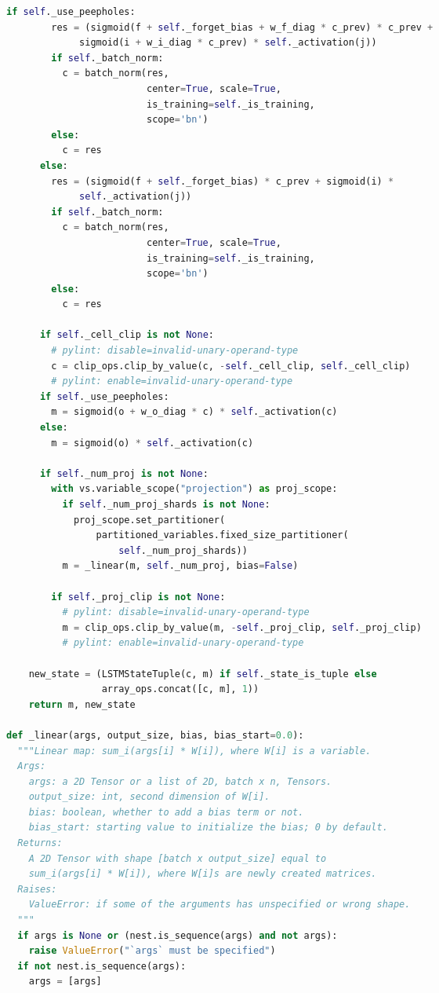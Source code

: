 \begin{landscape}
\begin{multicols}{2}
\begin{lstlisting}[language=Python]
      if self._use_peepholes:
        res = (sigmoid(f + self._forget_bias + w_f_diag * c_prev) * c_prev +
             sigmoid(i + w_i_diag * c_prev) * self._activation(j))
        if self._batch_norm:
          c = batch_norm(res,
                         center=True, scale=True,
                         is_training=self._is_training,
                         scope='bn')
        else:
          c = res
      else:
        res = (sigmoid(f + self._forget_bias) * c_prev + sigmoid(i) *
             self._activation(j))
        if self._batch_norm:
          c = batch_norm(res,
                         center=True, scale=True,
                         is_training=self._is_training,
                         scope='bn')
        else:
          c = res

      if self._cell_clip is not None:
        # pylint: disable=invalid-unary-operand-type
        c = clip_ops.clip_by_value(c, -self._cell_clip, self._cell_clip)
        # pylint: enable=invalid-unary-operand-type
      if self._use_peepholes:
        m = sigmoid(o + w_o_diag * c) * self._activation(c)
      else:
        m = sigmoid(o) * self._activation(c)

      if self._num_proj is not None:
        with vs.variable_scope("projection") as proj_scope:
          if self._num_proj_shards is not None:
            proj_scope.set_partitioner(
                partitioned_variables.fixed_size_partitioner(
                    self._num_proj_shards))
          m = _linear(m, self._num_proj, bias=False)

        if self._proj_clip is not None:
          # pylint: disable=invalid-unary-operand-type
          m = clip_ops.clip_by_value(m, -self._proj_clip, self._proj_clip)
          # pylint: enable=invalid-unary-operand-type

    new_state = (LSTMStateTuple(c, m) if self._state_is_tuple else
                 array_ops.concat([c, m], 1))
    return m, new_state

def _linear(args, output_size, bias, bias_start=0.0):
  """Linear map: sum_i(args[i] * W[i]), where W[i] is a variable.
  Args:
    args: a 2D Tensor or a list of 2D, batch x n, Tensors.
    output_size: int, second dimension of W[i].
    bias: boolean, whether to add a bias term or not.
    bias_start: starting value to initialize the bias; 0 by default.
  Returns:
    A 2D Tensor with shape [batch x output_size] equal to
    sum_i(args[i] * W[i]), where W[i]s are newly created matrices.
  Raises:
    ValueError: if some of the arguments has unspecified or wrong shape.
  """
  if args is None or (nest.is_sequence(args) and not args):
    raise ValueError("`args` must be specified")
  if not nest.is_sequence(args):
    args = [args]


\end{lstlisting}
\end{multicols}
\end{landscape}
